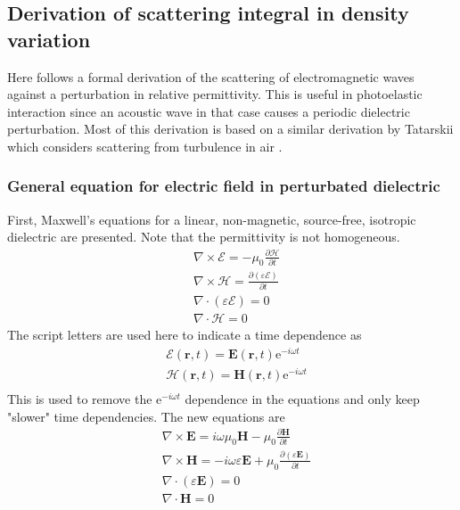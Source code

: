 \documentclass[10pt,a4paper,draft]{scrartcl}
\begin{document}
	\subsection{Derivation of scattering integral in density variation \label{app:scatterint}}
	Here follows a formal derivation of the scattering of electromagnetic waves against a perturbation in relative permittivity. This is useful in photoelastic interaction since an acoustic wave in that case causes a periodic dielectric perturbation. Most of this derivation is based on a similar derivation by Tatarskii which considers scattering from turbulence in air \cite{Tatarskii1971}.
	
	\subsubsection{General equation for electric field in perturbated dielectric}
	First, Maxwell's equations for a linear, non-magnetic, source-free, isotropic dielectric are presented. Note that the permittivity is not homogeneous.
	\begin{align*}
		&\nabla \times \bm{\mathcal{E}} = -\mu_0 \frac{\partial \bm{\mathcal{H}}}{\partial t} \\
		&\nabla \times \bm{\mathcal{H}} = \frac{\partial (\varepsilon \bm{\mathcal{E}})}{\partial t} \\
		&\nabla \cdot (\varepsilon \bm{\mathcal{E}}) = 0 \\
		&\nabla \cdot \bm{\mathcal{H}} = 0
	\end{align*}
	The script letters are used here to indicate a time dependence as
	\begin{align*}
		&\bm{\mathcal{E}}(\bm{r},t) = \bm{E}(\bm{r},t) \text{e}^{-i\omega t} \\
		&\bm{\mathcal{H}}(\bm{r},t) = \bm{H}(\bm{r},t) \text{e}^{-i\omega t} \\
	\end{align*}
	This is used to remove the e$^{-i\omega t}$ dependence in the equations and only keep "slower" time dependencies. The new equations are
	\begin{align*}
		&\nabla \times \bm{E} = i\omega \mu_0 \bm{H} - \mu_0 \frac{\partial \bm{H}}{\partial t} \\
		&\nabla \times \bm{H} = -i\omega \varepsilon \bm{E} + \mu_0 \frac{\partial (\varepsilon \bm{E})}{\partial t} \\
		&\nabla \cdot (\varepsilon \bm{E}) = 0 \\
		&\nabla \cdot \bm{H} = 0
	\end{align*}
\end{document}
